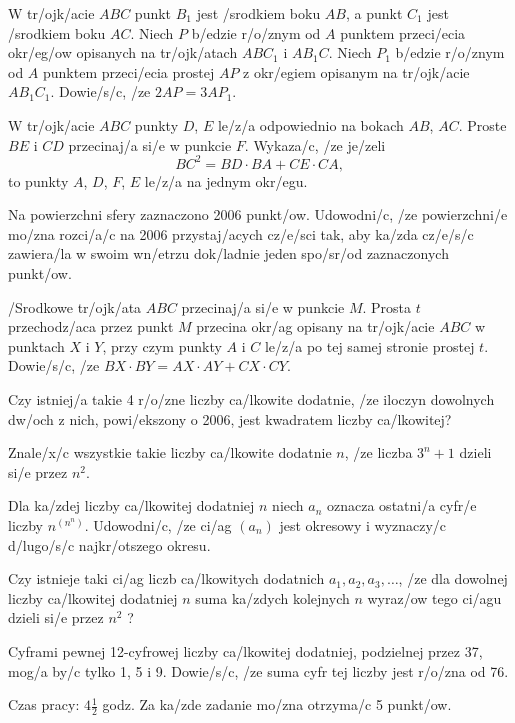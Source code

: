 \documentclass{bw06}
\begin{document}
\begin{problems}
\item 
W tr/ojk/acie $ABC$ punkt $B_1$ jest /srodkiem boku $AB$, a punkt
$C_1$ jest /srodkiem boku $AC$. Niech $P$ b/edzie r/o/znym od $A$ punktem przeci/ecia
okr/eg/ow opisanych na tr/ojk/atach $ABC_1$ i $AB_1C$.
Niech $P_1$ b/edzie r/o/znym od $A$ punktem przeci/ecia prostej $AP$
z okr/egiem opisanym na tr/ojk/acie $AB_1C_1$. Dowie/s/c, /ze $2AP = 3AP_1$.

\item
W tr/ojk/acie $ABC$ punkty $D$, $E$ le/z/a odpowiednio na bokach $AB$, $AC$.
Proste $BE$ i $CD$ przecinaj/a si/e w punkcie $F$. Wykaza/c, /ze je/zeli
\[BC^2=BD\cdot BA+CE\cdot CA,\]
to punkty $A$, $D$, $F$, $E$ le/z/a na jednym okr/egu.

\item
Na powierzchni sfery zaznaczono 2006 punkt/ow.
Udowodni/c, /ze powierzchni/e mo/zna rozci/a/c na 2006 przystaj/acych cz/e/sci tak,
aby ka/zda cz/e/s/c zawiera/la w swoim wn/etrzu dok/ladnie jeden spo/sr/od zaznaczonych punkt/ow.

\item
/Srodkowe tr/ojk/ata $ABC$ przecinaj/a si/e w punkcie $M$.
Prosta $t$ przechodz/aca przez punkt $M$ przecina okr/ag opisany
na tr/ojk/acie $ABC$ w punktach $X$ i $Y$, przy czym
punkty $A$ i $C$ le/z/a po tej samej stronie prostej $t$.
Dowie/s/c, /ze $BX\cdot BY=AX\cdot AY + CX\cdot CY$.

\item
Czy istniej/a takie 4 r/o/zne liczby ca/lkowite dodatnie, /ze
iloczyn dowolnych dw/och z nich, powi/ekszony o 2006, jest
kwadratem liczby ca/lkowitej?

\item
Znale/x/c wszystkie takie liczby ca/lkowite dodatnie $n$,
/ze liczba $3^n+1$ dzieli si/e przez $n^2$.

\item
Dla ka/zdej liczby ca/lkowitej dodatniej $n$ niech $a_n$
oznacza ostatni/a cyfr/e liczby $n^{(n^n)}$. Udowodni/c, /ze ci/ag
$(a_n)$ jest okresowy i wyznaczy/c d/lugo/s/c najkr/otszego okresu.

\item
Czy istnieje taki ci/ag liczb ca/lkowitych dodatnich $a_1,a_2,a_3,\ldots$,
/ze dla dowolnej liczby ca/lkowitej dodatniej $n$ suma ka/zdych kolejnych $n$ wyraz/ow tego ci/agu
dzieli si/e przez $n^2$ ?

\item
Cyframi pewnej 12-cyfrowej liczby ca/lkowitej dodatniej, podzielnej przez 37,
mog/a by/c tylko 1, 5 i 9. Dowie/s/c, /ze suma cyfr tej liczby jest r/o/zna od 76.

\end{problems}

Czas pracy: $4\frac{1}{2}$ godz. Za ka/zde zadanie mo/zna otrzyma/c 5 punkt/ow.
\end{document}
